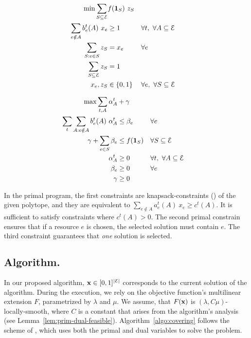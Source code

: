 \begin{minipage}[t]{0.45\textwidth}
\begin{align*}
\min  \sum_{S \subseteq \mathcal{E}} &f(\mathbf{1}_{S})\ z_{S} \\
\sum_{e \notin A} b_{e}^{t}(A) \ x_{e} &\geq 1 & &  \forall t,\ \forall A \subseteq \mathcal{E} \\
\sum_{S: e \in S} z_{S}  &= x_{e}	& & \forall e \\
\sum_{S \subseteq \mathcal{E}} z_{S} &= 1 & & \\
x_{e}, z_{S} &\in \{0,1\} & & \forall e,\ \forall S \subseteq \mathcal{E}\\
\end{align*}
\end{minipage}
\quad
\begin{minipage}[t]{0.5\textwidth}
\begin{align*}
\max \sum_{t, A} \alpha^{t}_{A} &+ \gamma \\
\sum_{t} \sum_{A: e \notin A} b_{e}^{t}(A) \ \alpha_{A}^{t} &\leq \beta_{e}  & &  \forall e \\
\gamma + \sum_{e \in S} \beta_{e} &\leq f(\mathbf{1}_{S})  & & \forall S \subseteq \mathcal{E}\\
\alpha^{t}_{A} &\geq 0 & & \forall t,\ \forall A \subseteq \mathcal{E}\\
\beta_e &\geq 0 & & \forall e\\
\gamma &\geq 0 & &
\end{align*}
\end{minipage}

In the primal program, the first constraints are knapsack-constraints (\cite{CarrFleischer:2000}) of the given polytope, and they are equivalent to $\sum_{e \notin A} a_{e}^{t}(A) \ x_{e} \geq c^{t}(A)$. It is sufficient to satisfy constraints where $c^{t}(A) > 0$. The second primal constrain ensures that if a resource $e$ is chosen, the selected solution must contain $e$.
The third constraint guarantees that \emph{one} solution is selected.

\subsection{Algorithm.}
In our proposed algorithm, $\mathbf{x} \in [0, 1]^{|\mathcal{E}|}$ corresponds to the current solution of the algorithm. During the execution, we rely on the objective function's multilinear extension $F$, parametrized by $\lambda$ and $\mu$. We assume, that $F(\mathbf{x})$ is $(\lambda, C \mu)$-locally-smooth, where $C$ is a constant that arises from the algorithm's analysis (see Lemma~\ref{lem:prim-dual-feasible}). Algorithm~\ref{algo:covering} follows the scheme of \cite{Thang20:Online-Primal-Dual}, which uses both the primal and dual variables to solve the problem.

